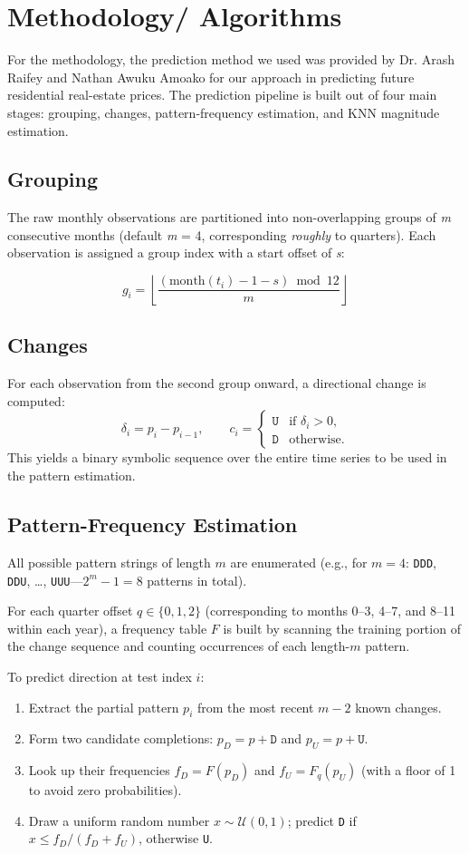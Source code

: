 \documentclass{article}
\begin{document}
\section{Methodology/ Algorithms }

For the methodology, the prediction method we used was provided by Dr. Arash Raifey and Nathan Awuku Amoako for our approach in predicting future residential real-estate prices.
The prediction pipeline is built out of four main stages: grouping, changes, pattern-frequency estimation, and KNN magnitude estimation.
\subsection{Grouping}
The raw monthly observations are partitioned into non-overlapping groups of \textit{m} consecutive months (default \textit{m} = 4, corresponding \textit{roughly} to quarters). Each observation is assigned a group index with a start offset of \textit{s}:
    
\[
g_i = \left\lfloor \frac{(\text{month}(t_i) - 1 - s) \bmod 12}{m} \right\rfloor
\]

\subsection{Changes}
For each observation from the second group onward, a directional change is computed:
\[
\delta_i = p_i - p_{i-1}, \qquad
c_i =
\begin{cases}
\texttt{U} & \text{if } \delta_i > 0,\\
\texttt{D} & \text{otherwise}.
\end{cases}
\]
This yields a binary symbolic sequence over the entire time series to be used in the pattern estimation.
\subsection{Pattern-Frequency Estimation}
All possible pattern strings of length $m$ are enumerated (e.g., for $m=4$: \texttt{DDD}, \texttt{DDU}, \ldots, \texttt{UUU}---$2^m-1 = 8$ patterns in total).
 
For each quarter offset $q \in \{0,1,2\}$ (corresponding to months 0--3, 4--7, and 8--11 within each year), a frequency table $F$ is built by scanning the training portion of the change sequence and counting occurrences of each length-$m$ pattern.
 
To predict direction at test index $i$:
 
\begin{enumerate}
  \item Extract the partial pattern $p_i$ from the most recent $m-2$ known changes.
  \item Form two candidate completions: $p_D = p + \texttt{D}$ and $p_U = p +\texttt{U}$.
  \item Look up their frequencies $f_D = F(p_D)$ and $f_U = F_q(p_U)$ (with a floor of 1 to avoid zero probabilities).
  \item Draw a uniform random number $x \sim \mathcal{U}(0,1)$; predict \texttt{D} if $x \leq f_D / (f_D + f_U)$, otherwise \texttt{U}.
\end{enumerate}
 
\end{document}
